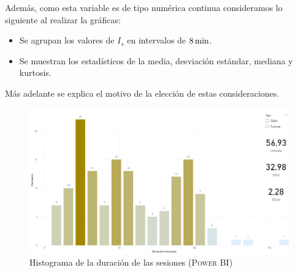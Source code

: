 \documentclass[11pt,a4paper]{book}
\theoremstyle{definition}%
\begin{document}
                Además, como esta variable es de tipo numérica continua consideramos lo siguiente al realizar la gráficas:
                \begin{itemize}
                    \item Se agrupan los valores de $I_s$ en intervalos de $8\,\textup{min}$.
                    \item Se muestran los estadísticos de la media, desviación estándar, mediana y kurtosis.
                \end{itemize}
                Más adelante se explica el motivo de la elección de estas consideraciones.
                \begin{figure}[H]
                    \centering
                    \includegraphics[width=1\textwidth]{Sources/histograma_DuracionGlobal.png}
                    \caption{Histograma de la duración de las sesiones (\textsc{Power BI})}
                    \label{fig:histograma_DuracionGlobal}
                \end{figure}
\end{document}
